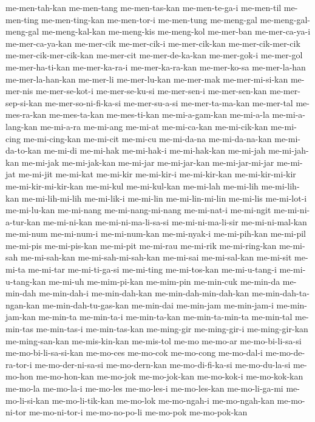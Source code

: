 {me-men-tah-kan me-men-tang me-men-tas-kan me-men-te-ga-i me-men-til
me-men-ting me-men-ting-kan me-men-tor-i me-men-tung me-meng-gal
me-meng-gal-meng-gal me-meng-kal-kan me-meng-kis me-meng-kol me-mer-ban
me-mer-ca-ya-i me-mer-ca-ya-kan me-mer-cik me-mer-cik-i me-mer-cik-kan
me-mer-cik-mer-cik me-mer-cik-mer-cik-kan me-mer-cit me-mer-de-ka-kan
me-mer-gok-i me-mer-gol me-mer-ha-ti-kan me-mer-ka-ra-i me-mer-ka-ra-kan
me-mer-ko-sa me-mer-la-han me-mer-la-han-kan me-mer-li me-mer-lu-kan
me-mer-mak me-mer-mi-si-kan me-mer-nis me-mer-se-kot-i me-mer-se-ku-si
me-mer-sen-i me-mer-sen-kan me-mer-sep-si-kan me-mer-so-ni-fi-ka-si
me-mer-su-a-si me-mer-ta-ma-kan me-mer-tal me-mes-ra-kan me-mes-ta-kan
me-mes-ti-kan me-mi-a-gam-kan me-mi-a-la me-mi-a-lang-kan me-mi-a-ra
me-mi-ang me-mi-at me-mi-ca-kan me-mi-cik-kan me-mi-cing me-mi-cing-kan
me-mi-cit me-mi-cu me-mi-da-na me-mi-da-na-kan me-mi-da-to-kan me-mi-di
me-mi-hak me-mi-hak-i me-mi-hak-kan me-mi-jah me-mi-jah-kan me-mi-jak
me-mi-jak-kan me-mi-jar me-mi-jar-kan me-mi-jar-mi-jar me-mi-jat me-mi-jit
me-mi-kat me-mi-kir me-mi-kir-i me-mi-kir-kan me-mi-kir-mi-kir
me-mi-kir-mi-kir-kan me-mi-kul me-mi-kul-kan me-mi-lah me-mi-lih
me-mi-lih-kan me-mi-lih-mi-lih me-mi-lik-i me-mi-lin me-mi-lin-mi-lin
me-mi-lis me-mi-lot-i me-mi-lu-kan me-mi-nang me-mi-nang-mi-nang
me-mi-nat-i me-mi-ngit me-mi-ni-a-tur-kan me-mi-ni-kan
me-mi-ni-ma-li-sa-si me-mi-ni-ma-li-sir me-mi-ni-mal-kan me-mi-num
me-mi-num-i me-mi-num-kan me-mi-nyak-i me-mi-pih-kan me-mi-pil me-mi-pis
me-mi-pis-kan me-mi-pit me-mi-rau me-mi-rik me-mi-ring-kan me-mi-sah
me-mi-sah-kan me-mi-sah-mi-sah-kan me-mi-sai me-mi-sal-kan me-mi-sit
me-mi-ta me-mi-tar me-mi-ti-ga-si me-mi-ting me-mi-tos-kan me-mi-u-tang-i
me-mi-u-tang-kan me-mi-uh me-mim-pi-kan me-mim-pin me-min-cuk me-min-da
me-min-dah me-min-dah-i me-min-dah-kan me-min-dah-min-dah-kan
me-min-dah-ta-ngan-kan me-min-dah-tu-gas-kan me-min-dai me-min-jam
me-min-jam-i me-min-jam-kan me-min-ta me-min-ta-i me-min-ta-kan
me-min-ta-min-ta me-min-tal me-min-tas me-min-tas-i me-min-tas-kan
me-ming-gir me-ming-gir-i me-ming-gir-kan me-ming-san-kan me-mis-kin-kan
me-mis-tol me-mo me-mo-ar me-mo-bi-li-sa-si me-mo-bi-li-sa-si-kan
me-mo-ces me-mo-cok me-mo-cong me-mo-dal-i me-mo-de-ra-tor-i
me-mo-der-ni-sa-si me-mo-dern-kan me-mo-di-fi-ka-si me-mo-du-la-si
me-mo-hon me-mo-hon-kan me-mo-jok me-mo-jok-kan me-mo-kok-i me-mo-kok-kan
me-mo-la me-mo-la-i me-mo-les me-mo-les-i me-mo-les-kan me-mo-li-ga-mi
me-mo-li-si-kan me-mo-li-tik-kan me-mo-lok me-mo-ngah-i me-mo-ngah-kan
me-mo-ni-tor me-mo-ni-tor-i me-mo-no-po-li me-mo-pok me-mo-pok-kan
}
